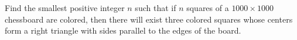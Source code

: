 Find the smallest positive integer $n$ such that if $n$ squares of a $1000 \times 1000$ chessboard are colored, then there will exist three colored squares whose centers form a right triangle with sides parallel to the edges of the board.